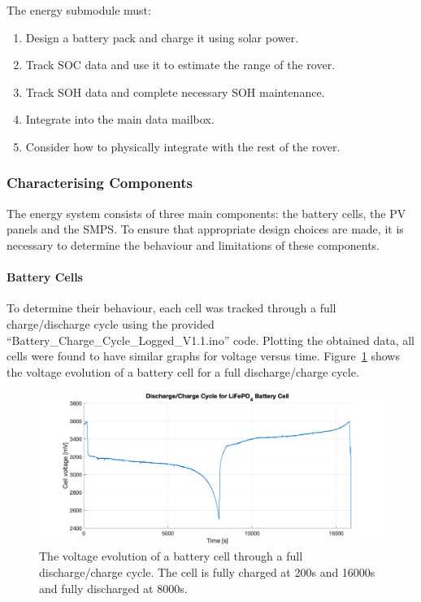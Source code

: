 \documentclass[a4paper]{article}
\begin{document}
\vspace{-10pt}
The energy submodule must:
\begin{enumerate}
    \item Design a battery pack and charge it using solar power.
    \item Track SOC data and use it to estimate the range of the rover.
    \item Track SOH data and complete necessary SOH maintenance.
    \item Integrate into the main data mailbox.
    \item Consider how to physically integrate with the rest of the rover.
\end{enumerate}

\subsubsection{Characterising Components}
The energy system consists of three main components: the battery cells, the 
PV panels and the SMPS. To ensure that appropriate design choices are made, 
it is necessary to determine the behaviour and limitations of these components.

\paragraph*{Battery Cells}
To determine their behaviour, each cell was tracked through a full charge/discharge 
cycle using the provided “Battery\_Charge\_Cycle\_Logged\_V1.1.ino” 
code\cite{chargeCode}. Plotting the obtained data, all cells were found to 
have similar graphs for voltage versus time. Figure~\ref{fig:charge_cycle} 
shows the voltage evolution of a battery cell for a full discharge/charge cycle.

\begin{figure}[H]
    \centering
    \includegraphics[scale=0.22]{Charge_Cycle2.png}
    \caption{The voltage evolution of a battery cell through a full discharge/charge cycle. The
    cell is fully charged at 200s and 16000s and fully discharged at 8000s.}
    \label{fig:charge_cycle}
\end{figure}
\end{document}
